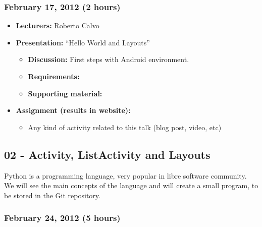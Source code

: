 \documentclass[a4paper]{article}
\begin{document}

\subsubsection{February 17, 2012 (2 hours)}

\begin{itemize}
\item \textbf{Lecturers:} Roberto Calvo
\item \textbf{Presentation:} ``Hello World and Layouts''
  \begin{itemize}
  \item \textbf{Discussion:} First steps with Android environment.
  \item \textbf{Requirements:} 
  \item \textbf{Supporting material:}
  \end{itemize}
\item \textbf{Assignment (results in website):}
  \begin{itemize}
  \item Any kind of activity
    related to this talk (blog post, video, etc)
  \end{itemize}
\end{itemize}


\subsection{02 - Activity, ListActivity and Layouts}

Python is a programming language, very popular in libre software
community. We will see the main concepts of the language and will
create a small program, to be stored in the Git repository.

\subsubsection{February 24, 2012 (5 hours)}
\end{document}
